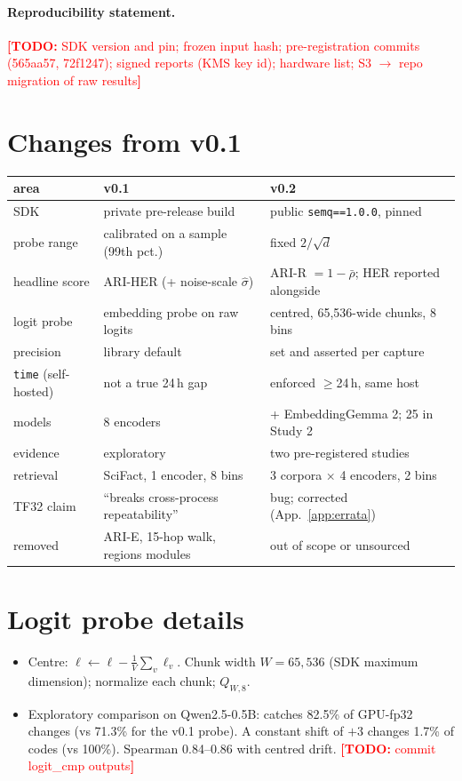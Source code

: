 \documentclass{article}
\newcommand{\todo}[1]{\textcolor{red}{\textbf{[TODO:} #1\textbf{]}}}
\newcommand{\cond}[1]{\texttt{#1}}
\begin{document}
\paragraph{Reproducibility statement.} \todo{SDK version and pin; frozen input hash; pre-registration commits (565aa57, 72f1247); signed reports (KMS key id); hardware list; S3 $\rightarrow$ repo migration of raw results}

\appendix
\section{Changes from v0.1}\label{app:changes}
\begin{table}[h]
\centering\scriptsize
\begin{tabular}{p{2.3cm}p{4.1cm}p{5.2cm}}
\toprule
area & v0.1 & v0.2 \\
\midrule
SDK & private pre-release build & public \texttt{semq==1.0.0}, pinned \\
probe range & calibrated on a sample (99th pct.) & fixed $2/\sqrt d$ \\
headline score & ARI-HER (+ noise-scale $\hat\sigma$) & ARI-R $=1-\bar\rho$; HER reported alongside \\
logit probe & embedding probe on raw logits & centred, 65,536-wide chunks, 8 bins \\
precision & library default & set and asserted per capture \\
\cond{time} (self-hosted) & not a true 24\,h gap & enforced $\ge$24\,h, same host \\
models & 8 encoders & + EmbeddingGemma 2; 25 in Study 2 \\
evidence & exploratory & two pre-registered studies \\
retrieval & SciFact, 1 encoder, 8 bins & 3 corpora $\times$ 4 encoders, 2 bins \\
TF32 claim & ``breaks cross-process repeatability'' & bug; corrected (App.~\ref{app:errata}) \\
removed & ARI-E, 15-hop walk, regions modules & out of scope or unsourced \\
\bottomrule
\end{tabular}
\end{table}

\section{Logit probe details}\label{app:logit}
\begin{itemize}
  \item Centre: $\ell \leftarrow \ell - \tfrac1V\sum_v \ell_v$. Chunk width $W=65{,}536$ (SDK maximum dimension); normalize each chunk; $Q_{W,8}$.
  \item Exploratory comparison on Qwen2.5-0.5B: catches 82.5\% of GPU-fp32 changes (vs 71.3\% for the v0.1 probe). A constant shift of $+3$ changes 1.7\% of codes (vs 100\%). Spearman 0.84--0.86 with centred drift. \todo{commit logit\_cmp outputs}
\end{itemize}
\end{document}
